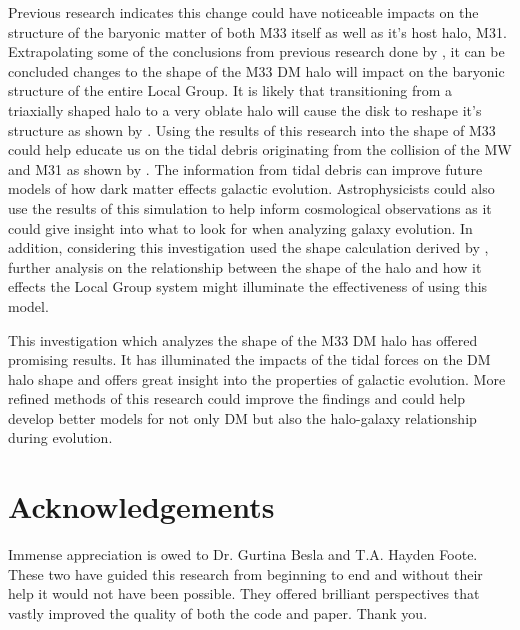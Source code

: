\documentclass[usenatbib]{mnras}
\begin{document}
Previous research indicates this change could have noticeable impacts on the structure of the baryonic matter of both M33 itself as well as it's host halo, M31. Extrapolating some of the conclusions from previous research done by \cite{Law10, Debattista_2013, Garavito-Camargo_2021}, it can be concluded changes to the shape of the M33 DM halo will impact on the baryonic structure of the entire Local Group. It is likely that transitioning from a triaxially shaped halo to a very oblate halo will cause the disk to reshape it's structure as shown by \cite{Debattista_2013}. Using the results of this research into the shape of M33 could help educate us on the tidal debris originating from the collision of the MW and M31 as shown by \cite{Law10}. The information from tidal debris can improve future models of how dark matter effects galactic evolution. Astrophysicists could also use the results of this simulation to help inform cosmological observations as it could give insight into what to look for when analyzing galaxy evolution. In addition, considering this investigation used the shape calculation derived by \cite{Garavito-Camargo_2021}, further analysis on the relationship between the shape of the halo and how it effects the Local Group system might illuminate the effectiveness of using this model.

This investigation which analyzes the shape of the M33 DM halo has offered promising results. It has illuminated the impacts of the tidal forces on the DM halo shape and offers great insight into the properties of galactic evolution. More refined methods of this research could improve the findings and could help develop better models for not only DM but also the halo-galaxy relationship during evolution.  

\section{Acknowledgements}
Immense appreciation is owed to Dr. Gurtina Besla and T.A. Hayden Foote. These two have guided this research from beginning to end and without their help it would not have been possible. They offered brilliant perspectives that vastly improved the quality of both the code and paper. Thank you. 


 



\bsp	%
\label{lastpage}
\end{document}
